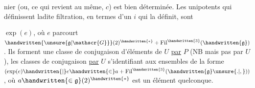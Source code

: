 nier (ou, ce qui revient au même, $c$) est bien déterminée. Les unipotents qui définissent ladite filtration, en termes d'un $i$ qui la définit, sont
$\exp(e)$, où $e$ parcourt $\handwritten{\unsure{\mathfrak{g}|\mathscr{G}}}(2)^{\handwritten{*}}+\operatorname{Fil}^{\handwritten{3}}(\handwritten{\mathfrak{g}})$. Ils forment une classe de conjugaison d'éléments de $U$ \uline{par} $P$ (NB mais pas par $U$), les classes de conjugaison \uline{par} $U$ s'identifiant aux ensembles de la forme $(\exp(e)\handwritten{\mid}e\handwritten{\in}a+\operatorname{Fil}^{\handwritten{3}}(\handwritten{\mathfrak{g}}\unsure{.|,}))$, où $a\handwritten{\in\mathfrak{g}}(2)^{\handwritten{*}}$ est un élément quelconque.

